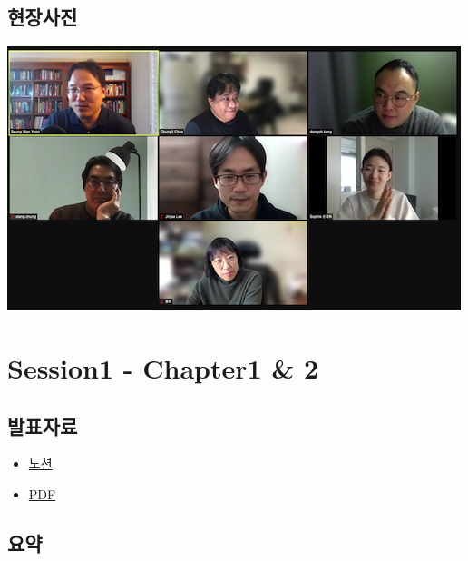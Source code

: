\documentclass[
]{book}
\providecommand{\tightlist}{%
  \setlength{\itemsep}{0pt}\setlength{\parskip}{0pt}}
\begin{document}
\hypertarget{uxd604uxc7a5uxc0acuxc9c4}{%
\section{현장사진}\label{uxd604uxc7a5uxc0acuxc9c4}}

\includegraphics{img/s1/1.png}

\hypertarget{session1---chapter1-2-1}{%
\chapter{Session1 - Chapter1 \& 2}\label{session1---chapter1-2-1}}

\hypertarget{uxbc1cuxd45cuxc790uxb8cc-1}{%
\section{발표자료}\label{uxbc1cuxd45cuxc790uxb8cc-1}}

\begin{itemize}
\tightlist
\item
  \href{https://www.notion.so/Ch3-4-Describing-Data-Continuous-Vars-f074b5ea4b7849b69c14a65d04f8aeeb}{노션}
\item
  \href{https://drive.google.com/file/d/1EC1y9vQwPwn-uGACFh5XblTW_ENIFtPE/view?usp=sharing}{PDF}
\end{itemize}

\hypertarget{uxc694uxc57d-1}{%
\section{요약}\label{uxc694uxc57d-1}}
\end{document}
